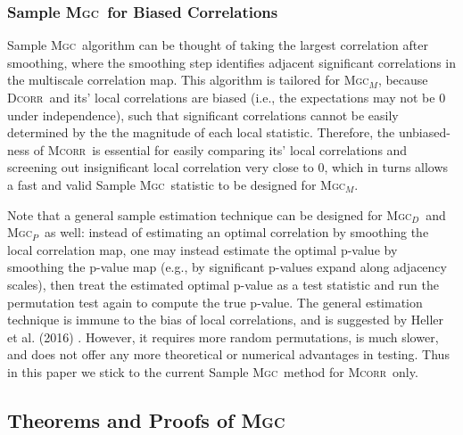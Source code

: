 \documentclass[11pt]{article}
\providecommand{\sct}[1]{{\normalfont\textsc{#1}}}
\newcommand{\Mgc}{\sct{Mgc}}
\newcommand{\Mgcp}{\sct{Mgc$_P$}}
\newcommand{\Mgcd}{\sct{Mgc$_D$}}
\newcommand{\Mgcm}{\sct{Mgc$_M$}}
\newcommand{\Dcorr}{\sct{Dcorr}}
\newcommand{\Mcorr}{\sct{Mcorr}}
\begin{document}
\subsubsection*{Sample \Mgc~for Biased Correlations}

Sample \Mgc~algorithm can be thought of taking the largest correlation after smoothing, where the smoothing step identifies adjacent significant correlations in the multiscale correlation map. This algorithm is tailored for \Mgcm, because \Dcorr~and its' local correlations are biased (i.e., the expectations may not be $0$ under independence), such that significant correlations cannot be easily determined by the the magnitude of each local statistic. Therefore, the unbiased-ness of \Mcorr~is essential for easily comparing its' local correlations and screening out insignificant local correlation very close to $0$, which in turns allows a fast and valid Sample \Mgc~statistic to be designed for \Mgcm. 



Note that a general sample estimation technique can be designed for \Mgcd~and \Mgcp~as well: instead of estimating an optimal correlation by smoothing the local correlation map, one may instead estimate the optimal p-value by smoothing the p-value map (e.g., by significant p-values expand along adjacency scales), then treat the estimated optimal p-value as a test statistic and run the permutation test again to compute the true p-value. The general estimation technique is immune to the bias of local correlations, and is suggested by Heller et al. (2016) \cite{heller2016consistent}. However, it requires more random permutations, is much slower, and does not offer any more theoretical or numerical advantages in testing. Thus in this paper we stick to the current Sample \Mgc~method for \Mcorr~only.


\subsection{Theorems and Proofs of \Mgc}
\label{appen:theory}
\end{document}
